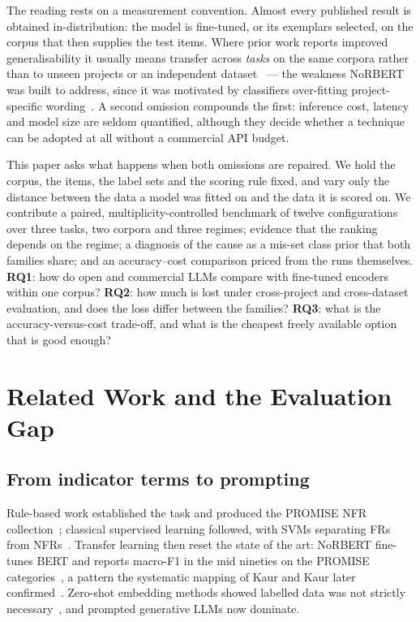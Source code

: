 \documentclass[conference]{IEEEtran}
\newcommand{\Fm}{macro-F1}
\begin{document}
The reading rests on a measurement convention. Almost every published result is
obtained in-distribution: the model is fine-tuned, or its exemplars selected, on
the corpus that then supplies the test items. Where prior work reports improved
generalisability it usually means transfer across \emph{tasks} on the same
corpora rather than to unseen projects or an independent
dataset~\cite{binkhonain2025} --- the weakness NoRBERT was built to address,
since it was motivated by classifiers over-fitting project-specific
wording~\cite{hey2020norbert}. A second omission compounds the first: inference
cost, latency and model size are seldom quantified, although they decide whether
a technique can be adopted at all without a commercial API budget.

This paper asks what happens when both omissions are repaired. We hold the
corpus, the items, the label sets and the scoring rule fixed, and vary only the
distance between the data a model was fitted on and the data it is scored on. We
contribute a paired, multiplicity-controlled benchmark of twelve configurations
over three tasks, two corpora and three regimes; evidence that the ranking
depends on the regime; a diagnosis of the cause as a mis-set class prior that
both families share; and an accuracy--cost comparison priced from the runs
themselves. \textbf{RQ1}: how do open and commercial LLMs compare with fine-tuned
encoders within one corpus? \textbf{RQ2}: how much is lost under cross-project
and cross-dataset evaluation, and does the loss differ between the families?
\textbf{RQ3}: what is the accuracy-versus-cost trade-off, and what is the
cheapest freely available option that is good enough?

\section{Related Work and the Evaluation Gap}
\subsection{From indicator terms to prompting}
Rule-based work established the task and produced the PROMISE NFR
collection~\cite{clelandhuang2007}; classical supervised learning followed, with
SVMs separating FRs from NFRs~\cite{kurtanovic2017}. Transfer learning then reset
the state of the art: NoRBERT fine-tunes BERT and reports \Fm{} in the mid
nineties on the PROMISE categories~\cite{hey2020norbert}, a pattern the
systematic mapping of Kaur and Kaur later confirmed~\cite{kaur2024}. Zero-shot
embedding methods showed labelled data was not strictly
necessary~\cite{alhoshan2023}, and prompted generative LLMs now dominate.
\end{document}
